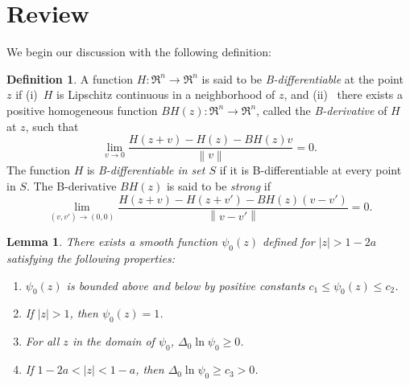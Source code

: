 \documentclass{article}
\newtheorem{lem}[thm]{Lemma}
\theoremstyle{definition}
\newtheorem{defn}{Definition}[section]
\theoremstyle{remark}
\newcommand{\envert}[1]{\left\lvert#1\right\rvert}
\let\abs=\envert
\newcommand{\enVert}[1]{\left\lVert#1\right\rVert}
\begin{document}
\section{Review}
\label{computation}

We begin our discussion with the following definition:

\begin{defn}

A function $H\colon \Re^n \to \Re^n$ is said to be
\emph{B-differentiable} at the point $z$ if (i)~$H$ is Lipschitz
continuous in a neighborhood of $z$, and (ii)~ there exists a positive
homogeneous function $BH(z)\colon \Re^n \to \Re^n$, called the
\emph{B-derivative} of $H$ at $z$, such that
\[ \lim_{v \to 0} \frac{H(z+v) - H(z) - BH(z)v}{\enVert{v}} = 0. \]
The function $H$ is \textit{B-differentiable in set $S$} if it is
B-differentiable at every point in $S$. The B-derivative $BH(z)$ is said
to be \textit{strong} if
\[ \lim_{(v,v') \to (0,0)} \frac{H(z+v) - H(z+v') - BH(z)(v
 -v')}{\enVert{v - v'}} = 0. \]
\end{defn}


\begin{lem}\label{limbog} There exists a smooth function $\psi_0(z)$
defined for $\abs{z}>1-2a$ satisfying the following properties\textup{:}
\begin{enumerate}
\renewcommand{\labelenumi}{(\roman{enumi})}
\item $\psi_0(z)$ is bounded above and below by positive constants
$c_1\leq \psi_0(z)\leq c_2$.
\item If $\abs{z}>1$, then $\psi_0(z)=1$.
\item For all $z$ in the domain of $\psi_0$, $\Delta_0\ln \psi_0\geq 0$.
\item If $1-2a<\abs{z}<1-a$, then $\Delta_0\ln \psi_0\geq
c_3>0$.
\end{enumerate}
\end{lem}
\end{document}

